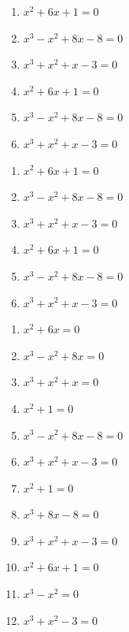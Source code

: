 \begin{exercise}
\item {}
		\begin{enumerate}[label=(\arabic{enumi}.\arabic*),leftmargin=2\parindent]
			\item $x^2+6x+1 = 0$
			\item $x^3-x^2+8x-8 = 0$
			\item $x^3+x^2+x-3 = 0$
			\item $x^2+6x+1 = 0$
			\item $x^3-x^2+8x-8 = 0$
			\item $x^3+x^2+x-3 = 0$
		\end{enumerate}
\item {}
		\begin{multicols}{2}
    		\begin{enumerate}[label=(\arabic{enumi}.\arabic*),leftmargin=2\parindent]
		        \item $x^2+6x+1 = 0$
				\item $x^3-x^2+8x-8 = 0$
				\item $x^3+x^2+x-3 = 0$
				\item $x^2+6x+1 = 0$
				\item $x^3-x^2+8x-8 = 0$
				\item $x^3+x^2+x-3 = 0$
    		\end{enumerate}
    	\end{multicols}
\item {}
		\begin{multicols}{3}
    		\begin{enumerate}[label=(\arabic{enumi}.\arabic*),leftmargin=2\parindent]
		        \item $x^2+6x = 0$
				\item $x^3-x^2+8x = 0$
				\item $x^3+x^2+x = 0$
				\item $x^2+1 = 0$
				\item $x^3-x^2+8x-8 = 0$
				\item $x^3+x^2+x-3 = 0$
				\item $x^2+1 = 0$
				\item $x^3+8x-8 = 0$
				\item $x^3+x^2+x-3 = 0$
				\item $x^2+6x+1 = 0$
				\item $x^3-x^2 = 0$
				\item $x^3+x^2-3 = 0$
    		\end{enumerate}
    	\end{multicols}
\end{exercise}
